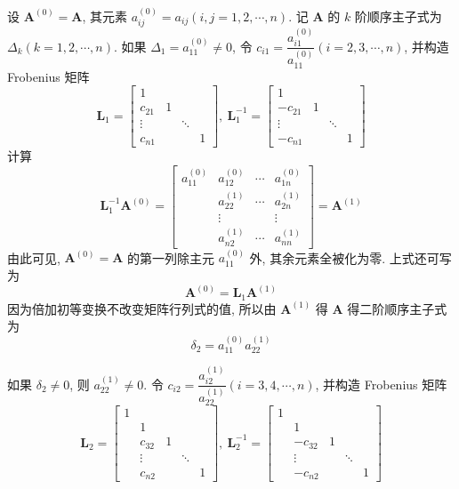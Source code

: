 设 $\bm{A}^{(0)} = \bm{A}$, 其元素 $a_{ij}^{(0)} = a_{ij} (i,j = 1, 2, \cdots, n)$. 记 $\bm{A}$ 的 $k$ 阶顺序主子式为 $\Delta_k(k = 1,2,\cdots,n)$. 如果 $\Delta_1 = a_{11}^{(0)} \neq 0$, 令 $c_{i1} = \dfrac{a_{i1}^{(0)}}{a_{11}^{(0)}} (i = 2, 3,\cdots, n)$, 并构造 Frobenius 矩阵
$$
    \bm{L}_1 = \begin{bmatrix}
        1      &   &        &   \\
        c_{21} & 1 &        &   \\
        \vdots &   & \ddots &   \\
        c_{n1} &   &        & 1
    \end{bmatrix},\ \bm{L}_1^{-1} = \begin{bmatrix}
        1       &   &        &   \\
        -c_{21} & 1 &        &   \\
        \vdots  &   & \ddots &   \\
        -c_{n1} &   &        & 1
    \end{bmatrix}
$$
计算
$$
    \bm{L}_1^{-1}\bm{A}^{(0)} = \begin{bmatrix}
        a_{11}^{(0)} & a_{12}^{(0)} & \cdots & a_{1n}^{(0)} \\
                     & a_{22}^{(1)} & \cdots & a_{2n}^{(1)} \\
                     & \vdots       &        & \vdots       \\
                     & a_{n2}^{(1)} & \cdots & a_{nn}^{(1)}
    \end{bmatrix} = \bm{A}^{(1)}
$$
由此可见, $\bm{A}^{(0)} = \bm{A}$ 的第一列除主元 $a_{11}^{(0)}$ 外, 其余元素全被化为零. 上式还可写为
$$
    \bm{A}^{(0)} = \bm{L}_1\bm{A}^{(1)}
$$
因为倍加初等变换不改变矩阵行列式的值, 所以由 $\bm{A}^{(1)}$ 得 $\bm{A}$ 得二阶顺序主子式为
$$
    \delta_2 = a_{11}^{(0)}a_{22}^{(1)}
$$
\par 如果 $\delta_2 \neq 0$, 则 $a_{22}^{(1)} \neq 0$. 令 $c_{i2} = \dfrac{a_{i2}^{(1)}}{a_{22}^{(1)}}(i=3,4,\cdots, n)$, 并构造 Frobenius 矩阵
$$
    \bm{L}_2 = \begin{bmatrix}
        1 &        &   &        &   \\
          & 1      &   &        &   \\
          & c_{32} & 1 &        &   \\
          & \vdots &   & \ddots &   \\
          & c_{n2} &   &        & 1
    \end{bmatrix}, \ \bm{L}_2^{-1} = \begin{bmatrix}
        1 &         &   &        &   \\
          & 1       &   &        &   \\
          & -c_{32} & 1 &        &   \\
          & \vdots  &   & \ddots &   \\
          & -c_{n2} &   &        & 1
    \end{bmatrix}
$$
